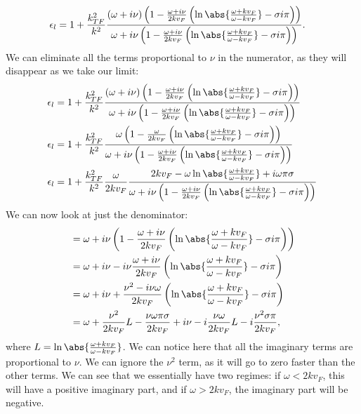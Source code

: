 \documentclass[../../main.tex]{subfiles}
\newcommand{\vf}{v_F}
\begin{document}
\begin{align} 
 \epsilon_l &= 1 + \frac{k_{TF}^2}{k^2} \frac{\left(\omega + i \nu \right) \left( 1 - \frac{\omega + i \nu}{2 k\vf} \left(\ln\abs{\frac{\omega + k\vf}{\omega - k\vf}} - \sigma i \pi\right)\right)}{\omega + i \nu\left( 1 - \frac{\omega + i \nu}{2 k\vf} \left(\ln\abs{\frac{\omega + k\vf}{\omega - k\vf}} - \sigma i \pi\right)\right)}.
\end{align}
We can eliminate all the terms proportional to $\nu$ in the numerator, as they will disappear as we take our limit:
\begin{align}
	\epsilon_l &= 1 + \frac{k_{TF}^2}{k^2} \frac{\left(\omega + i \nu \right) \left( 1 - \frac{\omega + i \nu}{2 k\vf} \left(\ln\abs{\frac{\omega + k\vf}{\omega - k\vf}} - \sigma i \pi\right)\right)}{\omega + i \nu\left( 1 - \frac{\omega + i \nu}{2 k\vf} \left(\ln\abs{\frac{\omega + k\vf}{\omega - k\vf}} - \sigma i \pi\right)\right)} \\
	\epsilon_l &= 1 + \frac{k_{TF}^2}{k^2} \frac{\omega \left( 1 - \frac{\omega}{2 k\vf} \left(\ln\abs{\frac{\omega + k\vf}{\omega - k\vf}} - \sigma i \pi\right)\right)}{\omega + i \nu\left( 1 - \frac{\omega + i \nu}{2 k\vf} \left(\ln\abs{\frac{\omega + k\vf}{\omega - k\vf}} - \sigma i \pi\right)\right)} \\
	\epsilon_l &= 1 + \frac{k_{TF}^2}{k^2} \frac{\omega}{2 k \vf} \frac{ 2 k\vf - \omega \ln\abs{\frac{\omega + k\vf}{\omega - k\vf}} + i \omega \pi \sigma}{\omega + i \nu\left( 1 - \frac{\omega + i \nu}{2 k\vf} \left(\ln\abs{\frac{\omega + k\vf}{\omega - k\vf}} - \sigma i \pi\right)\right)} \label{eq:LindhardExplicitParts:NumeratorSimp}
\end{align}
We can now look at just the denominator:
\begin{align}
	&= \omega + i \nu\left( 1 - \frac{\omega + i \nu}{2 k\vf} \left(\ln\abs{\frac{\omega + k\vf}{\omega - k\vf}} - \sigma i \pi\right)\right) \\
	&= \omega + i \nu - i\nu\frac{\omega + i \nu}{2 k\vf} \left(\ln\abs{\frac{\omega + k\vf}{\omega - k\vf}} - \sigma i \pi\right) \\
	&= \omega + i \nu + \frac{\nu^2 - i \nu \omega}{2 k \vf}  \left(\ln\abs{\frac{\omega + k\vf}{\omega - k\vf}} - \sigma i \pi\right) \\
	&= \omega + \frac{\nu^2}{2 k \vf} L - \frac{\nu \omega \pi \sigma}{2 k \vf} + i\nu - i\frac{\nu \omega}{2 k \vf} L - i \frac{\nu^2 \sigma \pi}{2 k \vf},
\end{align}
where $L = \ln\abs{\frac{\omega + k\vf}{\omega - k\vf}}$. We can notice here that all the imaginary terms are proportional to $\nu$. We can ignore the $\nu^2$ term, as it will go to zero faster than the other terms. We can see that we essentially have two regimes: if $\omega < 2 k\vf$, this will have a positive imaginary part, and if $\omega > 2k\vf$, the imaginary part will be negative.
\end{document}
